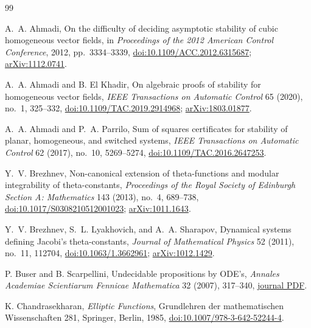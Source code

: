\documentclass[11pt]{article}
\begin{document}
\begin{thebibliography}{99}
\small
\setlength{\itemsep}{1pt}

A.~A. Ahmadi,
\newblock On the difficulty of deciding asymptotic stability of cubic
homogeneous vector fields,
\newblock in \emph{Proceedings of the 2012 American Control Conference},
2012, pp.~3334--3339,
\newblock \href{https://doi.org/10.1109/ACC.2012.6315687}
{doi:10.1109/ACC.2012.6315687};
\href{https://arxiv.org/abs/1112.0741}{arXiv:1112.0741}.

A.~A. Ahmadi and B. El Khadir,
\newblock On algebraic proofs of stability for homogeneous vector fields,
\newblock \emph{IEEE Transactions on Automatic Control} 65 (2020), no.~1,
325--332,
\newblock \href{https://doi.org/10.1109/TAC.2019.2914968}
{doi:10.1109/TAC.2019.2914968};
\href{https://arxiv.org/abs/1803.01877}{arXiv:1803.01877}.

A.~A. Ahmadi and P.~A. Parrilo,
\newblock Sum of squares certificates for stability of planar,
homogeneous, and switched systems,
\newblock \emph{IEEE Transactions on Automatic Control} 62 (2017), no.~10,
5269--5274,
\newblock \href{https://doi.org/10.1109/TAC.2016.2647253}
{doi:10.1109/TAC.2016.2647253}.

Y.~V. Brezhnev,
\newblock Non-canonical extension of theta-functions and modular
integrability of theta-constants,
\newblock \emph{Proceedings of the Royal Society of Edinburgh Section A:
Mathematics} 143 (2013), no.~4, 689--738,
\newblock \href{https://doi.org/10.1017/S0308210512001023}
{doi:10.1017/S0308210512001023};
\href{https://arxiv.org/abs/1011.1643}{arXiv:1011.1643}.

Y.~V. Brezhnev, S.~L. Lyakhovich, and A.~A. Sharapov,
\newblock Dynamical systems defining Jacobi's theta-constants,
\newblock \emph{Journal of Mathematical Physics} 52 (2011), no.~11,
112704,
\newblock \href{https://doi.org/10.1063/1.3662961}
{doi:10.1063/1.3662961};
\href{https://arxiv.org/abs/1012.1429}{arXiv:1012.1429}.

P. Buser and B. Scarpellini,
\newblock Undecidable propositions by ODE's,
\newblock \emph{Annales Academiae Scientiarum Fennicae Mathematica}
32 (2007), 317--340,
\newblock
\href{https://www.acadsci.fi/mathematica/Vol32/vol32pp317-340.pdf}
{journal PDF}.

K. Chandrasekharan,
\newblock \emph{Elliptic Functions},
\newblock Grundlehren der mathematischen Wissenschaften 281,
Springer, Berlin, 1985,
\newblock \href{https://doi.org/10.1007/978-3-642-52244-4}
{doi:10.1007/978-3-642-52244-4}.


\end{thebibliography}
\end{document}
